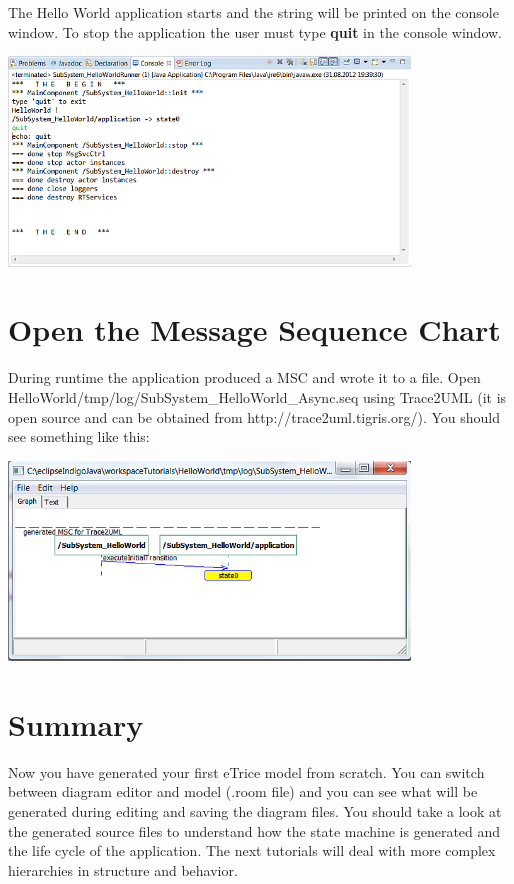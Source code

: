 The Hello World application starts and the string will be printed on the console window. To stop the application the user must type \textbf{quit} in the console window.

\includegraphics[width=0.8\textwidth]{images/015-HelloWorld08.png}

\section{Open the Message Sequence Chart}

During runtime the application produced a MSC and wrote it to a file. Open HelloWorld/tmp/log/SubSystem\_HelloWorld\_Async.seq using Trace2UML (it is open source and can be obtained from  http://trace2uml.tigris.org/). You should see something like this:

\includegraphics[width=0.8\textwidth]{images/015-HelloWorld09.png}


\section{Summary}

Now you have generated your first eTrice model from scratch. You can switch between diagram editor and model (.room file) and you can see what will be generated during editing and saving the diagram files. 
You should take a look at the generated source files to understand how the state machine is generated and the life cycle of the application. The next tutorials will deal with more complex hierarchies in structure and behavior.
